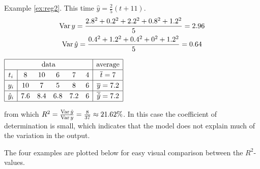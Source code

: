 \begin{tcolorbox}[exstyle]{}
\begin{description}
  \begin{minipage}[t]{0.57\linewidth}\vspace{0pt}
  \item[Example \ref{ex:reg2}.]\lstsp This time $\hat y=\frac 25(t+11)$.
  \begin{gather*}
  \operatorname{Var} y=\frac{2.8^2+0.2^2+2.2^2+0.8^2+1.2^2}5 =2.96\\
  \operatorname{Var}\hat y=\frac{0.4^2+1.2^2+0.4^2+0^2+1.2^2}5=0.64
  \end{gather*}
\end{minipage}\hfill\begin{minipage}[t]{0.42\linewidth}\vspace{0pt}
	\flushright
	$\renewcommand{\arraystretch}{1.2}
	\begin{array}{|c|ccccc|c|}
	\hline
	\multicolumn{6}{|c|}{\text{data}}&\text{average}\\\hline
	t_i&8&10&6&7&4&\cl t=7\\\hline
	y_i&10&7&5&8&6&\cl y=7.2\\\hline
	\hat y_i&7.6&8.4&6.8&7.2&6&\cl{\hat y}=7.2\\\hline
\end{array}$
\end{minipage}\par
 from which $R^2=\frac{\operatorname{Var}\hat y}{\operatorname{Var} y}=\frac{8}{37}\approx 21.62\%$. In this case the coefficient of determination is small, which indicates that the model does not explain much of the variation in the output.
\end{description}
\end{tcolorbox}

The four examples are plotted below for easy visual comparison between the $R^2$-values.

